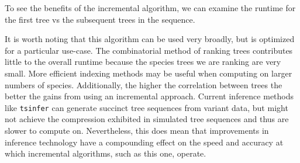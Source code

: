\documentclass{article}
\newcommand{\tsinfer}{{\texttt{tsinfer}}}
\begin{document}
To see the benefits of the incremental algorithm, we can examine the runtime for
the first tree vs the subsequent trees in the sequence.

It is worth noting that this algorithm can be used very broadly, but is optimized
for a particular use-case. The combinatorial method of ranking trees contributes
little to the overall runtime because the species trees we are ranking are very
small. More efficient indexing methods may be useful when computing on larger
numbers of species. Additionally, the higher the correlation between trees the
better the gains from using an incremental approach. Current inference methods
like \tsinfer{} can generate succinct tree sequences from variant data, but might
not achieve the compression exhibited in simulated tree sequences and thus
are slower to compute on. Nevertheless, this does mean that improvements in
inference technology have a compounding effect on the speed and accuracy
at which incremental algorithms, such as this one, operate.
\end{document}

